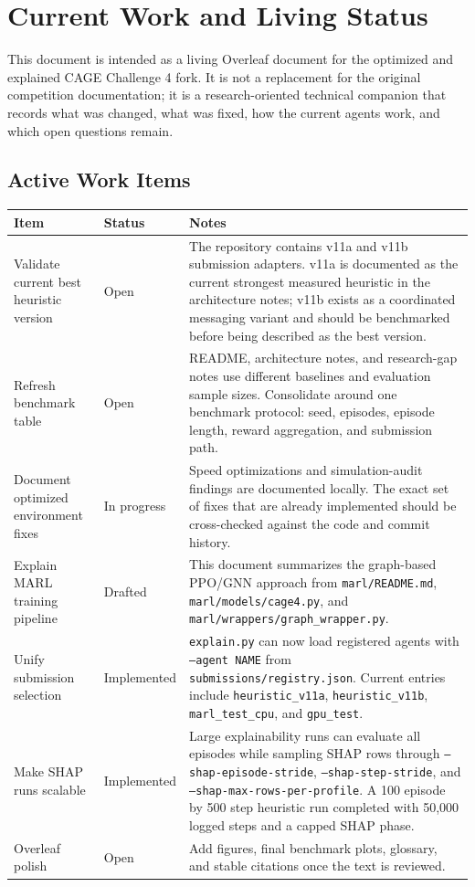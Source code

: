 \section{Current Work and Living Status}

This document is intended as a living Overleaf document for the optimized and explained CAGE Challenge 4 fork. It is not a replacement for the original competition documentation; it is a research-oriented technical companion that records what was changed, what was fixed, how the current agents work, and which open questions remain.

\subsection{Active Work Items}

\begin{longtable}{p{}p{}p{}}
\toprule
\textbf{Item} & \textbf{Status} & \textbf{Notes} \\
\midrule
Validate current best heuristic version & Open & The repository contains v11a and v11b submission adapters. v11a is documented as the current strongest measured heuristic in the architecture notes; v11b exists as a coordinated messaging variant and should be benchmarked before being described as the best version. \\
Refresh benchmark table & Open & README, architecture notes, and research-gap notes use different baselines and evaluation sample sizes. Consolidate around one benchmark protocol: seed, episodes, episode length, reward aggregation, and submission path. \\
Document optimized environment fixes & In progress & Speed optimizations and simulation-audit findings are documented locally. The exact set of fixes that are already implemented should be cross-checked against the code and commit history. \\
Explain MARL training pipeline & Drafted & This document summarizes the graph-based PPO/GNN approach from \texttt{marl/README.md}, \texttt{marl/models/cage4.py}, and \texttt{marl/wrappers/graph\_wrapper.py}. \\
Unify submission selection & Implemented & \texttt{explain.py} can now load registered agents with \texttt{--agent NAME} from \texttt{submissions/registry.json}. Current entries include \texttt{heuristic\_v11a}, \texttt{heuristic\_v11b}, \texttt{marl\_test\_cpu}, and \texttt{gpu\_test}. \\
Make SHAP runs scalable & Implemented & Large explainability runs can evaluate all episodes while sampling SHAP rows through \texttt{--shap-episode-stride}, \texttt{--shap-step-stride}, and \texttt{--shap-max-rows-per-profile}. A 100 episode by 500 step heuristic run completed with 50,000 logged steps and a capped SHAP phase. \\
Overleaf polish & Open & Add figures, final benchmark plots, glossary, and stable citations once the text is reviewed. \\
\bottomrule
\end{longtable}

